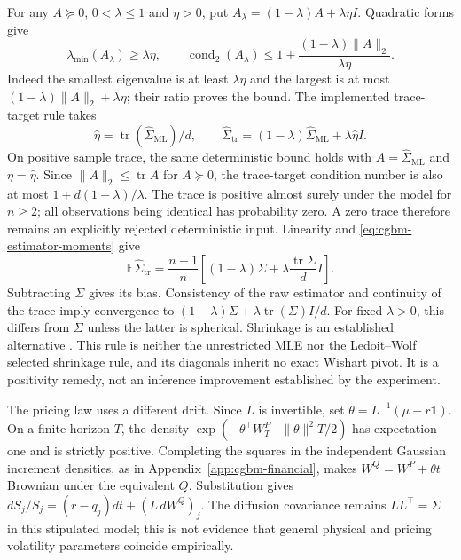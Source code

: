 \documentclass[11pt]{article}
\begin{document}
For any $A\succeq0$, $0<\lambda\leq1$ and $\eta>0$, put
$A_\lambda=(1-\lambda)A+\lambda\eta I$. Quadratic forms give
\begin{equation}
 \lambda_{\min}(A_\lambda)\geq\lambda\eta,
 \qquad \operatorname{cond}_2(A_\lambda)
 \leq1+\frac{(1-\lambda)\|A\|_2}{\lambda\eta}.
 \label{eq:cgbm-positive-shrinkage}
\end{equation}
Indeed the smallest eigenvalue is at least $\lambda\eta$ and the
largest is at most $(1-\lambda)\|A\|_2+\lambda\eta$; their ratio
proves the bound. The implemented trace-target rule takes
\begin{equation}
 \widehat\eta=\operatorname{tr}(\widehat\Sigma_{\mathrm{ML}})/d,
 \qquad \widehat\Sigma_{\mathrm{tr}}=
 (1-\lambda)\widehat\Sigma_{\mathrm{ML}}+\lambda\widehat\eta I.
 \label{eq:cgbm-trace-target-rule}
\end{equation}
On positive sample trace, the same deterministic bound holds with
$A=\widehat\Sigma_{\mathrm{ML}}$ and $\eta=\widehat\eta$.
Since $\|A\|_2\leq\operatorname{tr}A$ for $A\succeq0$, the
trace-target condition number is also at most $1+d(1-\lambda)/\lambda$.
The trace is positive almost surely under the model for $n\geq2$;
all observations being identical has probability zero. A zero trace
therefore remains an explicitly rejected deterministic input.
Linearity and \eqref{eq:cgbm-estimator-moments} give
\begin{equation}
 \mathbb E\widehat\Sigma_{\mathrm{tr}}=
 \frac{n-1}{n}\left[(1-\lambda)\Sigma+
 \lambda\frac{\operatorname{tr}\Sigma}{d}I\right].
 \label{eq:cgbm-trace-target-expectation}
\end{equation}
Subtracting $\Sigma$ gives its bias. Consistency of the raw estimator
and continuity of the trace imply convergence to
$(1-\lambda)\Sigma+\lambda\operatorname{tr}(\Sigma)I/d$.
For fixed $\lambda>0$, this differs from $\Sigma$ unless the latter
is spherical. Shrinkage is an established alternative \citep{ledoitwolf2004}.
This rule is neither the unrestricted MLE nor the
Ledoit--Wolf selected shrinkage rule, and its diagonals inherit
no exact Wishart pivot. It is a positivity remedy, not an inference
improvement established by the experiment.

The pricing law uses a different drift. Since $L$ is invertible, set
$\theta=L^{-1}(\mu-r\mathbf1)$. On a finite horizon $T$, the density
$\exp(-\theta^\top W_T^P-\|\theta\|^2T/2)$ has expectation one and
is strictly positive. Completing the squares in the independent
Gaussian increment densities, as in Appendix~\ref{app:cgbm-financial},
makes $W^Q=W^P+\theta t$ Brownian under the equivalent $Q$.
Substitution gives $dS_j/S_j=(r-q_j)dt+(L\,dW^Q)_j$.
The diffusion covariance remains $LL^\top=\Sigma$ in this stipulated
model; this is not evidence that general physical and pricing
volatility parameters coincide empirically.
\end{document}
